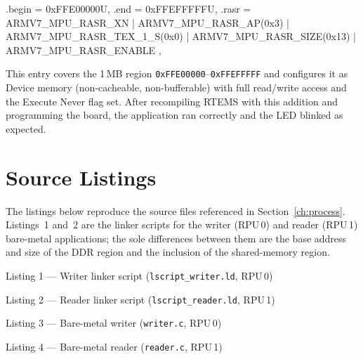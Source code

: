 \documentclass[
	a4paper,
]{CSMakotoTechnicalReport}
\begin{document}
\begin{bashcode}
{
  .begin = 0xFFE00000U,
  .end   = 0xFFEFFFFFU,
  .rasr  = ARMV7_MPU_RASR_XN |
           ARMV7_MPU_RASR_AP(0x3) |
           ARMV7_MPU_RASR_TEX_1_S(0x0) |
           ARMV7_MPU_RASR_SIZE(0x13) |
           ARMV7_MPU_RASR_ENABLE
},
\end{bashcode}

This entry covers the 1\,MB region \texttt{0xFFE00000}--\texttt{0xFFEFFFFF} and configures it as Device memory (non-cacheable, non-bufferable) with full read/write access and the Execute Never flag set.
After recompiling RTEMS with this addition and programming the board, the application ran correctly and the LED blinked as expected.



\appendix

\section{Source Listings}
\label{app:listings}

The listings below reproduce the source files referenced in Section~\ref{ch:process}.
Listings~1 and~2 are the linker scripts for the writer (RPU\,0) and reader (RPU\,1) bare-metal applications; the sole differences between them are the base address and size of the DDR region and the inclusion of the shared-memory region.

\label{lst:1}
\begin{appendixcode}{Listing 1 --- Writer linker script (\texttt{lscript\_writer.ld}, RPU\,0)}

\end{appendixcode}

\label{lst:2}
\begin{appendixcode}{Listing 2 --- Reader linker script (\texttt{lscript\_reader.ld}, RPU\,1)}

\end{appendixcode}

\label{lst:3}
\begin{appendixcode}{Listing 3 --- Bare-metal writer (\texttt{writer.c}, RPU\,0)}

\end{appendixcode}

\label{lst:4}
\begin{appendixcode}{Listing 4 --- Bare-metal reader (\texttt{reader.c}, RPU\,1)}

\end{appendixcode}
\end{document}
